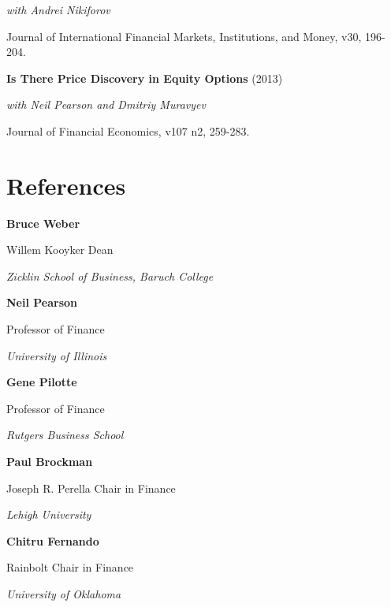 \documentclass[11pt,a4paper,]{awesome-cv}
\begin{document}
\textit{with Andrei Nikiforov}

Journal of International Financial Markets, Institutions, and Money,
v30, 196-204.

\textbf{Is There Price Discovery in Equity Options} (2013)

\textit{with Neil Pearson and Dmitriy Muravyev}

Journal of Financial Economics, v107 n2, 259-283.

\section{References}\label{references}

\textbf{Bruce Weber}

Willem Kooyker Dean

\textit{Zicklin School of Business, Baruch College}

\textbf{Neil Pearson}

Professor of Finance

\textit{University of Illinois}

\textbf{Gene Pilotte}

Professor of Finance

\textit{Rutgers Business School}

\textbf{Paul Brockman}

Joseph R. Perella Chair in Finance

\textit{Lehigh University}

\textbf{Chitru Fernando}

Rainbolt Chair in Finance

\textit{University of Oklahoma}
\end{document}
